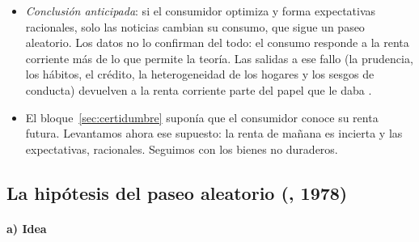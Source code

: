 \documentclass[11pt]{article}
\begin{document}
\begin{itemize}
\item \emph{Conclusión anticipada}: si el consumidor optimiza y forma expectativas racionales, solo las noticias cambian su consumo, que sigue un paseo aleatorio. Los datos no lo confirman del todo: el consumo responde a la renta corriente más de lo que permite la teoría. Las salidas a ese fallo (la prudencia, los hábitos, el crédito, la heterogeneidad de los hogares y los sesgos de conducta) devuelven a la renta corriente parte del papel que le daba .
\item El bloque~\ref{sec:certidumbre} suponía que el consumidor conoce su renta futura. Levantamos ahora ese supuesto: la renta de mañana es incierta y las expectativas, racionales. Seguimos con los bienes no duraderos.
\end{itemize}

\subsection{La hipótesis del paseo aleatorio (, 1978)}\label{sec:hall}

\paragraph{a) Idea}
\end{document}
